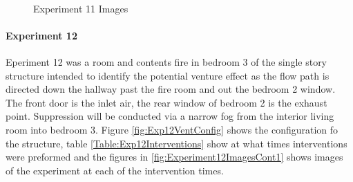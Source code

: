 \documentclass{article}
\begin{document}
\begin{figure}[H]
	\ContinuedFloat 
	\centering 
	 \ 
	 \ 
	\caption{Experiment 11 Images}
	\label{fig:Experiment11ImagesCont3} 
\end{figure}

\paragraph{Experiment 12}\mbox{}

Eperiment 12 was a room and contents fire in bedroom 3 of the single story structure intended to identify the potential venture effect as the flow path is directed down the hallway past the fire room and out the bedroom 2 window. The front door is the inlet air, the rear window of bedroom 2 is the exhaust point. Suppression will be conducted via a narrow fog from the interior living room into bedroom 3. Figure \ref{fig:Exp12VentConfig} shows the configuration fo the structure, table \ref{Table:Exp12Interventions} show at what times interventions were preformed and the figures in \ref{fig:Experiment12ImagesCont1} shows images of the experiment at each of the intervention times.
\end{document}
